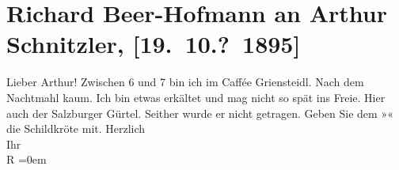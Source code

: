 

         
         \renewcommand{\erwaehntePersonen}{Personen: Richard Beer-Hofmann}
         \renewcommand{\erwaehnteOrte}{Orte: Café Griensteidl, Salzburg, Wien}
         \renewcommand{\erwaehnteWerke}{}
               \section[Richard Beer-Hofmann an Arthur Schnitzler, {[}19. 10.? 1895{]}]{ Richard Beer-Hofmann an Arthur Schnitzler, {[}19. 10.? 1895{]}}\nopagebreak{}\rehead{ }\begin{ledgroupsized}[t]{13cm}\normalsize\beginnumbering \toendnotes[C]{\smallbreak\pagebreak[2]} 
\toendnotes[C]{\smallbreak}\pstart
           \noindent{}{\pb}Lieber Arthur! Zwischen 6 und 7 bin ich im
               Caffée Griensteidl. Nach dem Nachtmahl kaum. Ich
               bin etwas erkältet und mag nicht so spät ins Freie. Hier auch der {\pb}Salzburger Gürtel. Seither wurde er nicht
               getragen. Geben Sie dem »\label{K_L00509-1v}\label{K_L00509-1h}« die Schildkröte mit.\pend
           \pstart
           Herzlich{\\[\baselineskip]}Ihr{\\[\baselineskip]}\spacefill\mbox{R}\pend
           \leftskip=0em{}
         
         \endnumbering{}\end{ledgroupsized}  \newcommand{\dateiname}{L00509}\newcommand{\titel}{Richard Beer-Hofmann an Arthur Schnitzler, [19. 10.? 1895]}\newcommand{\editorInnen}{ Martin Anton Müller und Gerd-Hermann Susen}
      